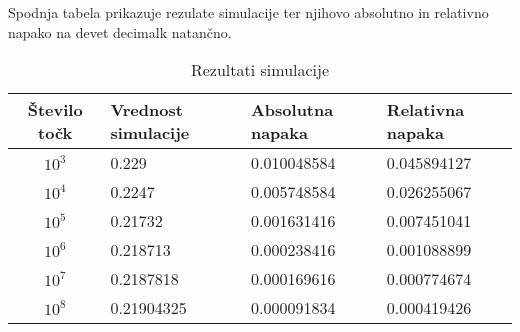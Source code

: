 \documentclass{amsart}
\theoremstyle{definition} %
\theoremstyle{plain} %
\begin{document}
Spodnja tabela prikazuje rezulate simulacije ter njihovo absolutno in relativno
napako na devet decimalk natančno.
\begin{table}[!ht]
    \caption{Rezultati simulacije}
    \begin{tabular}{|c|l|l|l|}
    \hline
    \textbf{Število točk} & \textbf{Vrednost simulacije} & \textbf{Absolutna napaka} & \textbf{Relativna napaka} \\ \hline
    $10^3$                & 0.229                        & 0.010048584               & 0.045894127               \\ \hline
    $10^4$                & 0.2247                       & 0.005748584               & 0.026255067               \\ \hline
    $10^5$                & 0.21732                      & 0.001631416               & 0.007451041               \\ \hline
    $10^6$                & 0.218713                     & 0.000238416               & 0.001088899               \\ \hline
    $10^7$                & 0.2187818                    & 0.000169616               & 0.000774674               \\ \hline
    $10^8$                & 0.21904325                   & 0.000091834               & 0.000419426               \\ \hline
    \end{tabular}
    \end{table}
\end{document}
